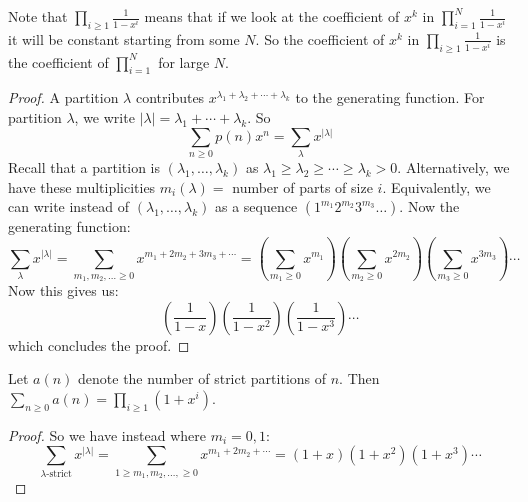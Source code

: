 \documentclass{report}
\begin{document}
Note that $\prod_{i \geq 1}\frac{1}{1 - x^{i}}$ means that if we look at the coefficient of $x^{k}$ in $\prod_{i = 1}^{N}\frac{1}{1 - x^{i}}$ it will be constant starting from some $N$. So the coefficient of $x^{k}$ in $\prod_{i \geq 1}\frac{1}{1 - x^{i}}$ is the coefficient of $\prod_{i = 1}^{N}$ for large $N$.
    \begin{proof}
        A partition $\lambda$ contributes $x^{\lambda_{1} + \lambda_{2} + \cdots + \lambda_{k}}$ to the generating function. For partition $\lambda$, we write $\lvert \lambda \rvert = \lambda_{1} + \cdots +\lambda_{k}$. So
            \begin{equation*}
                \sum_{n \geq 0}p(n)x^{n} = \sum_{\lambda} x^{\lvert \lambda \rvert}
            \end{equation*}
        Recall that a partition is $(\lambda_{1}, \ldots , \lambda_{k})$ as $\lambda_{1} \geq \lambda_{2} \geq \cdots \geq \lambda_{k} > 0$. Alternatively, we have these multiplicities $m_{i}(\lambda) = $ number of parts of size $i$. Equivalently, we can write instead of $(\lambda_{1}, \ldots , \lambda_{k})$ as a sequence $(1^{m_{1}}2^{m_{2}} 3^{m_{3}}\ldots )$. Now the generating function:
            \begin{equation*}
                \sum_{\lambda} x^{\lvert \lambda \rvert} = \sum_{m_{1}, m_{2}, \ldots  \geq 0} x^{m_{1} + 2m_{2} + 3m_{3} + \cdots } = \left(\sum_{m_{1} \geq 0}x^{m_{1}}\right)\left(\sum_{m_{2} \geq 0}x^{2m_{2}}\right)\left(\sum_{m_{3} \geq 0}x^{3m_{3}}\right)\cdots 
            \end{equation*}
        Now this gives us:
            \begin{equation*}
                \left(\dfrac{1}{1 - x}\right)\left(\dfrac{1}{1 - x^{2}}\right)\left(\dfrac{1}{1 - x^{3}}\right)\cdots 
            \end{equation*}
        which concludes the proof.
    \end{proof}

\begin{examples}
    \begin{example}
        Let $a(n)$ denote the number of strict partitions of $n$. Then $\sum_{n \geq 0}a(n) = \prod_{i \geq 1}(1 + x^{i})$.
            \begin{proof}
                So we have instead where $m_{i} = 0, 1$:
                    \begin{equation*}
                        \sum_{\lambda \text{-strict}}x^{\lvert \lambda \rvert} = \sum_{1 \geq m_{1}, m_{2}, \ldots , \geq 0}x^{m_{1} + 2m_{2} + \cdots } = (1 + x)(1 + x^{2})(1 + x^{3}) \cdots 
                    \end{equation*}
            \end{proof}
    \end{example}
\end{examples}
\end{document}
